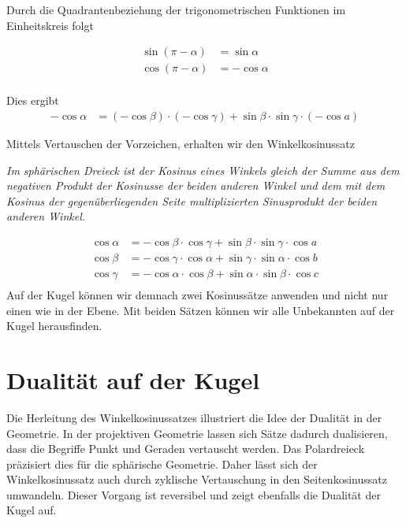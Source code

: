 \begin{refsection}
Durch die Quadrantenbeziehung der trigonometrischen Funktionen im Einheitskreis folgt

\begin{align*}
\sin (\pi-\alpha) &= \sin \alpha\\
\cos (\pi-\alpha) &= - \cos \alpha\\
\end{align*}

Dies ergibt
\begin{align*}
{-\cos \alpha} &= {(-\cos \beta)} \cdot {(-\cos \gamma)} + {\sin \beta} \cdot {\sin \gamma} \cdot {(-\cos a)}
\end{align*}

Mittels Vertauschen der Vorzeichen, erhalten wir den Winkelkosinussatz

\begin{satz}\textit{Im sphärischen Dreieck ist der Kosinus eines Winkels gleich der Summe aus dem negativen Produkt der Kosinusse der beiden anderen Winkel und dem mit dem Kosinus der gegenüberliegenden Seite multiplizierten Sinusprodukt der beiden anderen Winkel.}
\label{skript:kugel:satz:Winkelkosinussatz}
\end{satz}
\begin{align*}
{\cos \alpha} &= {-\cos \beta} \cdot {\cos \gamma} + {\sin \beta} \cdot {\sin \gamma} \cdot {\cos a}\\
{\cos \beta} &= {-\cos \gamma} \cdot {\cos \alpha} + {\sin \gamma} \cdot {\sin \alpha} \cdot {\cos b}\\
{\cos \gamma} &= {-\cos \alpha} \cdot {\cos \beta} + {\sin \alpha} \cdot {\sin \beta} \cdot {\cos c}\\
\end{align*}
Auf der Kugel können wir demnach zwei Kosinussätze anwenden und nicht nur einen wie in der Ebene. Mit beiden Sätzen können wir alle Unbekannten auf der Kugel herausfinden.



\section{Dualität auf der Kugel}
Die Herleitung des Winkelkosinussatzes illustriert die Idee der Dualität in der Geometrie. In der projektiven Geometrie lassen sich Sätze dadurch dualisieren, dass die Begriffe Punkt und Geraden vertauscht werden. Das Polardreieck präzisiert dies für die sphärische Geometrie.
Daher lässt sich der Winkelkosinussatz auch durch zyklische Vertauschung in den Seitenkosinussatz umwandeln. Dieser Vorgang ist reversibel und zeigt ebenfalls die Dualität der Kugel auf.


\end{refsection}
